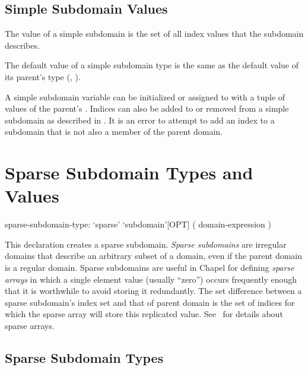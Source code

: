 \subsection{Simple Subdomain Values}

The value of a simple subdomain is the set of all index values
that the subdomain describes.


The default value of a simple subdomain type is the same as the default value
of its parent's type
(, ).

A simple subdomain variable can be initialized or assigned to
with a tuple of values of the parent's .
Indices can also be added to or removed from a simple subdomain
as described in .
It is an error to attempt to add an index to a subdomain that is not also
a member of the parent domain.


\section{Sparse Subdomain Types and Values}
\label{Sparse_Subdomain_Types_and_Values}

\begin{syntax}
sparse-subdomain-type:
  `sparse' `subdomain'[OPT] ( domain-expression )
\end{syntax}

This declaration creates a sparse subdomain.
 \emph{Sparse subdomains} are irregular domains that describe an
arbitrary subset of a domain, even if the parent domain is a regular
domain.  Sparse subdomains are useful in Chapel for
defining \emph{sparse arrays} in which a single element value (usually ``zero'')
 occurs
frequently enough that it is worthwhile to avoid storing it
redundantly.  The set difference between a sparse subdomain's index set
and that of parent domain is the set of indices for which the
sparse array will store this replicated value.
See~ for details about sparse arrays.

\subsection{Sparse Subdomain Types}

